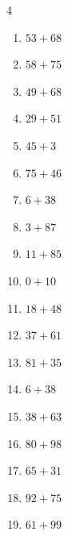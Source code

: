 


\setcounter{quesnum}{120}

\begin{multicols}{4}
\begin{enumerate}
  \itemsep=5pt
  \item $53+68$
        \phantom{$=121$}

  \item $58+75$
        \phantom{$=133$}

  \item $49+68$
        \phantom{$=117$}

  \item $29+51$
        \phantom{$=80$}

  \item $45+3$
        \phantom{$=48$}

  \item $75+46$
        \phantom{$=121$}

  \item $6+38$
        \phantom{$=44$}

  \item $3+87$
        \phantom{$=90$}

  \item $11+85$
        \phantom{$=96$}

  \item $0+10$
        \phantom{$=10$}

  \item $18+48$
        \phantom{$=66$}

  \item $37+61$
        \phantom{$=98$}

  \item $81+35$
        \phantom{$=116$}

  \item $6+38$
        \phantom{$=44$}

  \item $38+63$
        \phantom{$=101$}

  \item $80+98$
        \phantom{$=178$}

  \item $65+31$
        \phantom{$=96$}

  \item $92+75$
        \phantom{$=167$}

  \item $61+99$
        \phantom{$=160$}


\end{enumerate}
\end{multicols}
